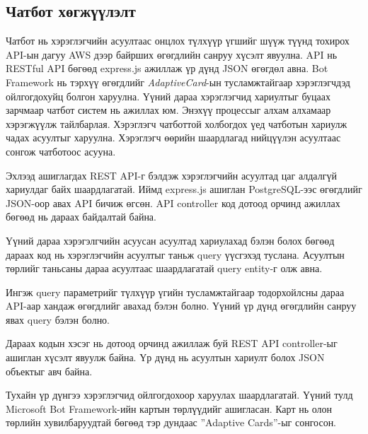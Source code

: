 \newpage
\subsection{Чатбот хөгжүүлэлт}
Чатбот нь хэрэглэгчийн асуултаас онцлох түлхүүр үгшийг шүүж түүнд тохирох API-ын дагуу AWS дээр байрших өгөгдлийн санруу хүсэлт явуулна. API нь RESTful API бөгөөд express.js ажиллаж үр дүнд JSON өгөгдөл авна. Bot Framework нь тэрхүү өгөгдлийг  \textit{AdaptiveCard}-ын тусламжтайгаар хэрэглэгчдэд ойлгогдохуйц болгон харуулна. Үүний дараа хэрэглэгчид хариултыг буцаах зарчмаар чатбот систем нь ажиллах юм. Энэхүү процессыг алхам алхамаар хэрэгжүүлж тайлбарлая. Хэрэглэгч чатботтой холбогдох үед чатботын хариулж чадах асуултыг харуулна. Хэрэглэгч өөрийн шаардлагад нийцүүлэн асуултаас сонгож чатботоос асууна. 

Эхлээд ашиглагдах REST API-г бэлдэж хэрэглэгчийн асуултад цаг алдалгүй хариулдаг байх шаардлагатай. Иймд express.js ашиглан PostgreSQL-ээс өгөгдлийг JSON-оор авах API бичиж өгсөн. API controller код дотоод орчинд ажиллах бөгөөд нь дараах байдалтай байна. 


Үүний дараа хэрэгэлгчийн асуусан асуултад хариулахад бэлэн болох бөгөөд дараах код нь хэрэглэгчийн асуултыг таньж query үүсгэхэд туслана. Асуултын төрлийг таньсаны дараа асуултаас шаардлагатай query entity-г олж авна. 



Ингэж query параметрийг түлхүүр үгийн тусламжтайгаар тодорхойлсны дараа API-аар хандаж өгөгдлийг авахад бэлэн болно. Үүний үр дүнд өгөгдлийн санруу явах query бэлэн болно. 


Дараах кодын хэсэг нь дотоод орчинд ажиллаж буй REST API controller-ыг ашиглан хүсэлт явуулж байна. Үр дүнд нь асуултын хариулт болох JSON объектыг авч байна. 


Тухайн үр дүнгээ хэрэглэгчид ойлгогдохоор харуулах шаардлагатай. Үүний тулд Microsoft Bot Framework-ийн картын төрлүүдийг ашигласан. Карт нь олон төрлийн хувилбаруудтай бөгөөд тэр дундаас ”Adaptive Cards”-ыг сонгосон.

